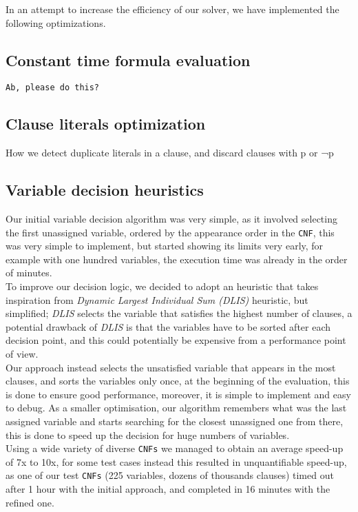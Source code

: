 \documentclass[a4paper]{article}
\begin{document}
In an attempt to increase the efficiency of our solver, we have implemented the following optimizations.\\

\subsection{Constant time formula evaluation}

\texttt{Ab, please do this?}

\subsection{Clause literals optimization}

How we detect duplicate literals in a clause, and discard clauses with p or ¬p

\subsection{Variable decision heuristics}

Our initial variable decision algorithm was very simple, as it involved selecting the first unassigned variable, ordered by the appearance order in the \texttt{CNF}, this was very simple to implement, but started showing its limits very early, for example with one hundred variables, the execution time was already in the order of minutes. \\
To improve our decision logic, we decided to adopt an heuristic that takes inspiration from \emph{Dynamic Largest Individual Sum (DLIS)} heuristic, but simplified;
\emph{DLIS} selects the variable that satisfies the highest number of clauses, a potential drawback of \emph{DLIS} is that the variables have to be sorted after each decision point, and this could potentially be expensive from a performance point of view. \\
Our approach instead selects the unsatisfied variable that appears in the most clauses, and sorts the variables only once, at the beginning of the evaluation, this is done to ensure good performance, moreover, it is simple to implement and easy to debug.
As a smaller optimisation, our algorithm remembers what was the last assigned variable and starts searching for the closest unassigned one from there, this is done to speed up the decision for huge numbers of variables. \\
Using a wide variety of diverse \texttt{CNFs} we managed to obtain an average speed-up of 7x to 10x, for some test cases instead this resulted in unquantifiable speed-up, as one of our test \texttt{CNFs} (225 variables, dozens of thousands clauses) timed out after 1 hour with the initial approach, and completed in 16 minutes with the refined one.
\end{document}
